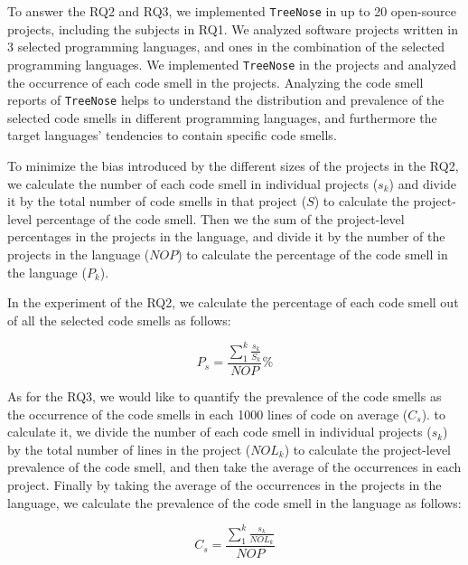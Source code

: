 To answer the RQ2 and RQ3, we implemented \texttt{TreeNose} in up to 20
open-source projects, including the subjects in RQ1. We analyzed software
projects written in 3 selected programming languages, and ones in the
combination of the selected programming languages. We implemented
\texttt{TreeNose} in the projects and analyzed the occurrence of each code
smell in the projects. Analyzing the code smell reports of \texttt{TreeNose}
helps to understand the distribution and prevalence of the selected code smells
in different programming languages, and furthermore the target languages'
tendencies to contain specific code smells.

 To minimize the bias introduced by the different sizes of the projects in the
 RQ2, we calculate the number of each code smell in individual projects
 ($s_{k}$) and divide it by the total number of code smells in that project
 ({$S$}) to calculate the project-level percentage of the code smell. Then we
 the sum of the project-level percentages in the projects in the language, and
 divide it by the number of the projects in the language ($NOP$) to calculate
 the percentage of the code smell in the language ($P_{k}$).

In the experiment of the RQ2, we calculate the percentage of each code smell
out of all the selected code smells as follows:

\vspace{-1em}

\begin{equation}
    P_{s} = \frac{\sum_{1}^{k}\frac{{s_{k}}}{S_{k}}}{NOP}\%
\end{equation}

As for the RQ3, we would like to quantify the prevalence of the code smells as
the occurrence of the code smells in each 1000 lines of code on average
($C_{s}$). to calculate it, we divide the number of each code smell in
individual projects ($s_{k}$) by the total number of lines in the project
($NOL_{k}$) to calculate the project-level prevalence of the code smell, and
then take the average of the occurrences in each project. Finally by taking the
average of the occurrences in the projects in the language, we calculate the
prevalence of the code smell in the language as follows:

\vspace{-1.0em}

\begin{equation}
    C_{s} = \frac{\sum_{1}^{k}{\frac{s_{k}}{NOL_{k}}}}{NOP}
\end{equation}

